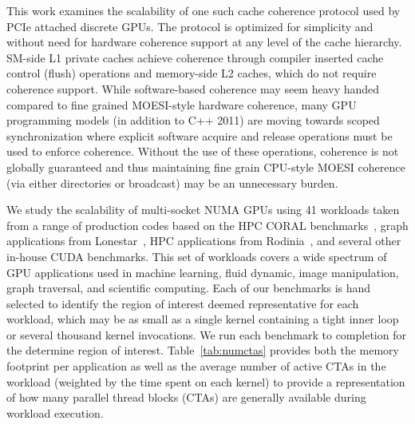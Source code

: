 This work examines the scalability of one such cache coherence 
protocol used by PCIe attached discrete GPUs. The protocol is optimized for simplicity
and without need for hardware coherence support at any level of the cache hierarchy.  
SM-side L1 private caches achieve coherence through 
compiler inserted cache control (flush) operations and memory-side L2 caches, which do not require 
coherence support. While software-based 
coherence may seem heavy handed compared to fine grained MOESI-style hardware 
coherence, many GPU programming models (in addition to C++ 2011) are moving 
towards scoped synchronization where explicit software acquire and release 
operations must be used to enforce coherence.  Without the use of these 
operations, coherence is not globally guaranteed and thus maintaining fine 
grain CPU-style MOESI coherence (via either directories or broadcast) may be an 
unnecessary burden.

We study the scalability of multi-socket NUMA GPUs using 41 workloads 
taken from a range of 
production codes based on the HPC CORAL benchmarks~\cite{coral}, graph 
applications from Lonestar~\cite{lonestar}, HPC applications from 
Rodinia~\cite{Che2009}, and several other in-house CUDA benchmarks. 
This set of workloads covers a wide spectrum of GPU applications used in 
machine learning, fluid dynamic, image manipulation, graph traversal, and
scientific computing.  Each of our benchmarks is hand selected to identify
the region of interest deemed representative for each workload, which may
be as small as a single kernel containing a tight inner loop or several thousand
kernel invocations.  We run each benchmark to completion for the determine
region of interest. Table~\ref{tab:numctas} provides both the memory footprint per application as well as the average number of active CTAs in the workload
(weighted by the time spent on each kernel) to provide a representation of 
how many parallel thread blocks (CTAs) are generally available
during workload execution.

